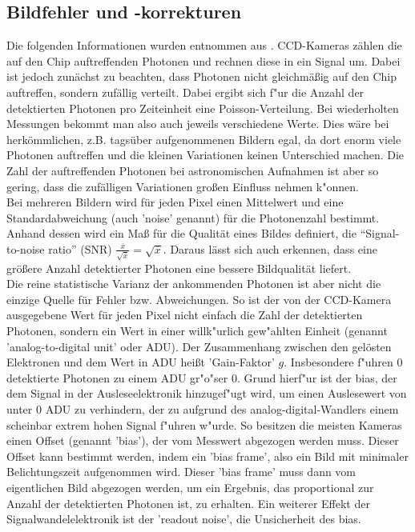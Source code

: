 \subsection{Bildfehler und -korrekturen}
Die folgenden Informationen wurden entnommen aus \cite{ry}. 
CCD-Kameras zählen die auf den Chip auftreffenden Photonen und rechnen diese in ein Signal um. Dabei ist jedoch zunächst zu beachten, dass Photonen nicht gleichmäßig auf den Chip auftreffen, sondern zufällig verteilt. Dabei ergibt sich f"ur die Anzahl der detektierten Photonen pro Zeiteinheit eine Poisson-Verteilung. Bei wiederholten Messungen bekommt man also auch jeweils verschiedene Werte. Dies wäre bei herkömmlichen, z.B. tagsüber aufgenommenen Bildern egal, da dort enorm viele Photonen auftreffen und die kleinen Variationen keinen Unterschied machen. Die Zahl der auftreffenden Photonen bei astronomischen Aufnahmen ist aber so gering, dass die zufälligen Variationen großen Einfluss nehmen k"onnen.\\
Bei mehreren Bildern wird für jeden Pixel einen Mittelwert und eine Standardabweichung (auch 'noise' genannt) für die Photonenzahl bestimmt. Anhand dessen wird ein Maß für die Qualität eines Bildes definiert, die \enquote{Signal-to-noise ratio} (SNR) $\frac{\overline{x}}{\sqrt{\overline{x}}} = \sqrt{\overline{x}}$.  Daraus lässt sich auch erkennen, dass eine größere Anzahl detektierter Photonen eine bessere Bildqualität liefert.\\
Die reine statistische Varianz der ankommenden Photonen ist aber nicht die einzige Quelle für Fehler bzw. Abweichungen. So ist der von der CCD-Kamera ausgegebene Wert für jeden Pixel nicht einfach die Zahl der detektierten Photonen, sondern ein Wert in einer willk"urlich gew"ahlten Einheit (genannt 'analog-to-digital unit' oder ADU). Der Zusammenhang zwischen den gelösten Elektronen und dem Wert in ADU heißt 'Gain-Faktor' $g$. Insbesondere f"uhren 0 detektierte Photonen zu einem ADU gr"o"ser 0. Grund hierf"ur ist der bias, der dem Signal in der Ausleseelektronik hinzugef"ugt wird, um einen Auslesewert von unter 0 ADU zu verhindern, der zu aufgrund des analog-digital-Wandlers einem scheinbar extrem hohen Signal f"uhren w"urde. So besitzen die meisten Kameras einen Offset (genannt 'bias'), der vom Messwert abgezogen werden muss. Dieser Offset kann bestimmt werden, indem ein 'bias frame', also ein Bild mit minimaler Belichtungszeit aufgenommen wird. Dieser 'bias frame' muss dann vom eigentlichen Bild abgezogen werden, um ein Ergebnis, das proportional zur Anzahl der detektierten Photonen ist, zu erhalten. Ein weiterer Effekt der Signalwandelelektronik ist der 'readout noise', die Unsicherheit des bias.
